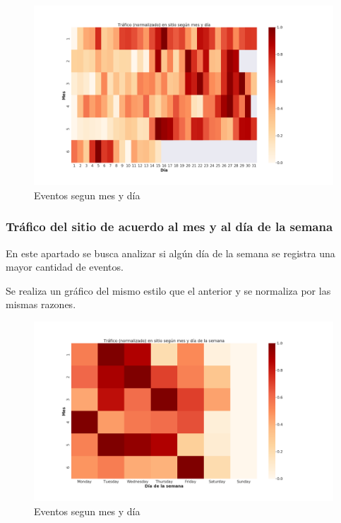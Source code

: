 \documentclass[a4paper]{article}
\begin{document}
\begin{figure}[h!]
	\includegraphics[width=\linewidth]{figures/030-eventos_segun_mes-heatmap.png}
	\caption{Eventos segun mes y día}
	\label{fig:mesdiasnormalizado}
\end{figure}

\subsubsection{Tráfico del sitio de acuerdo al mes y al día de la semana}

En este apartado se busca analizar si algún día de la semana se registra una mayor cantidad de eventos. 

Se realiza un gráfico del mismo estilo que el anterior y se normaliza por las mismas razones.


\begin{figure}[h!]
	\includegraphics[width=\linewidth]{figures/031-eventos_segun_dow-heatmap.png}
	\caption{Eventos segun mes y día}
	\label{fig:messemanasnormalizado}
\end{figure}
\end{document}
